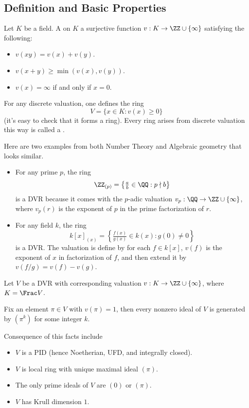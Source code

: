 \subsection{Definition and Basic Properties}
\begin{definition}
    Let $K$ be a field. A 
    on $K$ a surjective function $v : K \to \ZZ\cup\{\infty\}$
    satisfying the following:
    \begin{itemize}
    \item $v(xy) = v(x)+v(y)$.
    \item $v(x+y) \geq \min(v(x), v(y))$.
    \item $v(x)=\infty$ if and only if $x=0$.
    \end{itemize}
    For any discrete valuation, one defines the ring
    $$V = \{x\in K : v(x)\geq 0\}$$
    (it's easy to check that it forms a ring).
    Every ring arises from discrete valuation this way
    is called a .
\end{definition}
\begin{example}
Here are two examples from both Number Theory and 
Algebraic geometry that looks similar.
\begin{itemize}
    \item For any prime $p$, the ring 
    $$\ZZ_{(p)} = \left\{\tfrac ab \in\QQ : p\nmid b\right\}$$ 
    is a DVR because it comes with the $p$-adic valuation 
    $v_p : \QQ\to \ZZ\cup\{\infty\}$,
    where $v_p(r)$ is the exponent of $p$ in the prime
    factorization of $r$.
    \item For any field $k$, the ring
    $$k[x]_{(x)} = \left\{\tfrac{f(x)}{g(x)}\in k(x)
    : g(0)\neq 0\right\}$$
    is a DVR. The valuation is define by for each 
    $f\in k[x]$, $v(f)$
    is the exponent of $x$ in factorization of $f$,
    and then extend it by $v(f/g) = v(f)-v(g)$.
    \end{itemize}
\end{example}
\begin{proposition}
\label{prop:dvr_properties}
Let $V$ be a DVR with corresponding valuation
$v : K\to \ZZ\cup\{\infty\}$, where $K=\Frac V$.

Fix an element $\pi\in V$ with $v(\pi)=1$,
then every nonzero ideal of $V$ is generated by $(\pi^k)$
for some integer $k$.
\end{proposition}
Consequence of this facts include
\begin{itemize}
    \item $V$ is a PID (hence Noetherian, UFD, and integrally closed).
    \item $V$ is local ring with unique maximal ideal $(\pi)$.
    \item The only prime ideals of $V$ are $(0)$
    or $(\pi)$.
    \item $V$ has Krull dimension $1$.
\end{itemize}

